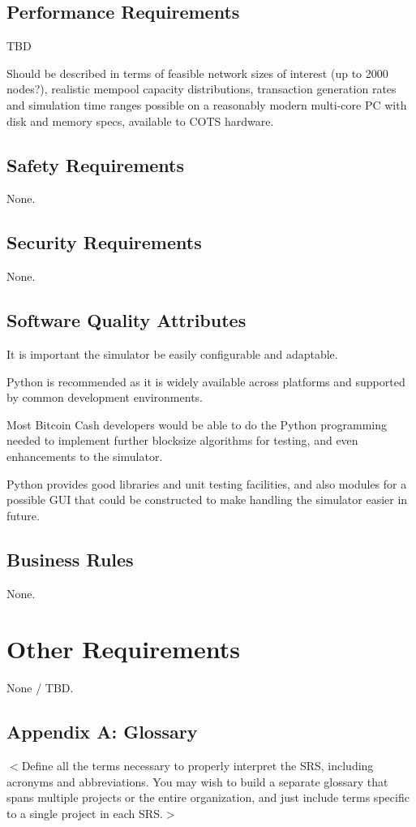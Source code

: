 \documentclass{scrreprt}
\begin{document}
\section{Performance Requirements}
TBD

Should be described in terms of feasible network sizes of interest (up to 2000 nodes?),
realistic mempool capacity distributions, transaction generation rates and simulation
time ranges possible on a reasonably modern multi-core PC with disk and memory specs,
available to COTS hardware.


\section{Safety Requirements}
None.

\section{Security Requirements}
None.

\section{Software Quality Attributes}
It is important the simulator be easily configurable and adaptable.

Python is recommended as it is widely available across platforms and supported
by common development environments.

Most Bitcoin Cash developers would be able to do the Python programming needed
to implement further blocksize algorithms for testing, and even enhancements
to the simulator.

Python provides good libraries and unit testing facilities, and also modules
for a possible GUI that could be constructed to make handling the simulator
easier in future.


\section{Business Rules}
None.


\chapter{Other Requirements}
None / TBD.

\section{Appendix A: Glossary}
$<$Define all the terms necessary to properly interpret the SRS, including
acronyms and abbreviations. You may wish to build a separate glossary that spans
multiple projects or the entire organization, and just include terms specific to
a single project in each SRS.$>$
\end{document}
